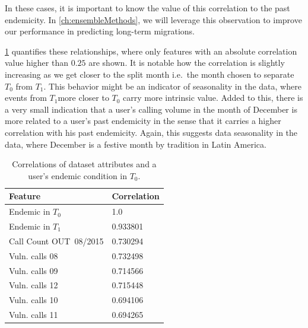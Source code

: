 In these cases, it is important to know the value of this correlation to the past endemicity.
In \cref{ch:ensembleMethods}, we will leverage this observation to improve our performance in predicting long-term migrations.

\cref{tab:featureCorrelations} quantifies these relationships, where only features with an absolute correlation value higher than $0.25$ are shown.
It is notable how the correlation is slightly increasing as we get closer to the split month i.e.\ the month chosen to separate $T_0$ from $T_1$.
This behavior might be an indicator of seasonality in the data, where events from $T_1$more closer to $T_0$ carry more intrinsic value.
Added to this, there is a very small indication that a user's calling volume in the month of December is more related to a user's past endemicity in the sense that it carries a higher correlation with his past endemicity.
Again, this suggests data seasonality in the data, where December is a festive month by tradition in Latin America.


\begin{table}
	\caption{Correlations of dataset attributes and a user's endemic condition in $T_0$.}
	\label{tab:featureCorrelations}
	\centering
	\begin{tabular}{l l }
		\toprule
		Feature & Correlation \\
		\midrule
		Endemic in $T_0$        & 1.0 \\
		Endemic in $T_1$        & 0.933801 \\
		Call Count  OUT\ 08/2015  & 0.730294 \\ 
		Vuln. calls  08 &0.732498 \\
		Vuln. calls  09   &0.714566 \\
		Vuln. calls 12  &0.715448 \\
		Vuln. calls  10  &0.694106 \\
		Vuln. calls  11   &0.694265 \\
		\bottomrule
	\end{tabular}
\end{table}


